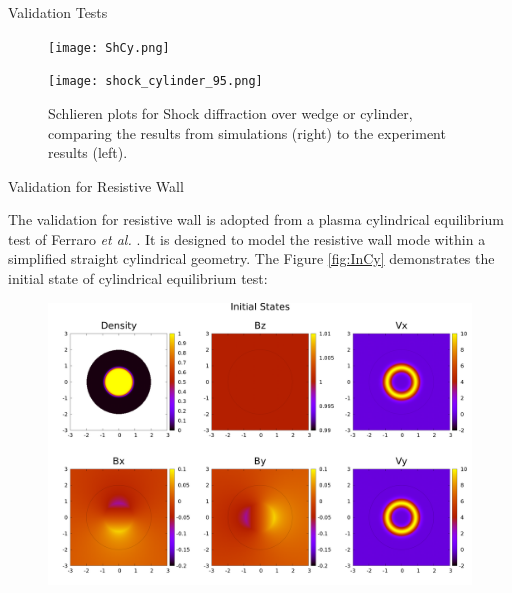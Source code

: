 \documentclass[final]{beamer}
\begin{document}
\begin{frame}{}
\begin{textblock}{19.0}
\begin{block}{Validation Tests}
\begin{minipage}{0.90\linewidth}
\begin{figure}
			\begin{minipage}{0.45\textwidth}
				\texttt{[image: ShCy.png]}
			\end{minipage}
			\hspace{-0.4cm}
			\begin{minipage}{0.4\textwidth}
				\texttt{[image: shock\_cylinder\_95.png]}
			\end{minipage}
			\vspace{0.2cm}
			
			
			\begin{minipage}{1.0\textwidth}
				\caption{Schlieren plots for Shock diffraction over wedge or cylinder, comparing the results from simulations (right) to the experiment results (left).}
				\label{fig:shockwedge}
			\end{minipage}
			
		\end{figure}
	\end{minipage}
\end{block}
\vspace{-0.6cm}

\begin{block}{Validation for Resistive Wall}
\begin{minipage}{0.90\linewidth}
	\justifying
	The validation for resistive wall is adopted from a plasma cylindrical equilibrium test of Ferraro \textit{et al.} \cite{ferraro2016multi}. It is designed to model the resistive wall mode within a simplified straight cylindrical geometry. The Figure \ref{fig:InCy} demonstrates the initial state of cylindrical equilibrium test: 
	\vspace{0.2cm}
	\begin{figure}
	\begin{minipage}{1.0\textwidth}
		\includegraphics[width=\textwidth]{InitialCylindricalEquilibrium.png}
	\end{minipage}
	\vspace{0.2cm}
	

\end{figure}
\end{minipage}
\end{block}
\end{textblock}
\end{frame}
\end{document}
